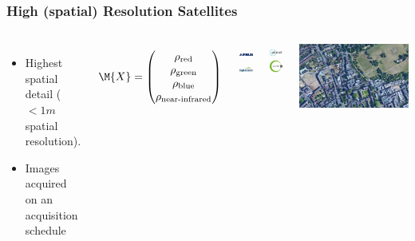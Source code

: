 \begin{frame}
\frametitle{High (spatial) Resolution Satellites}
\begin{columns}
	
	\begin{itemize}
		\item Highest spatial detail ($<1m$ spatial resolution).
		\item Images acquired on an acquisition schedule
	\end{itemize}
	
	\begin{equation*}
		\M{X} = \begin{pmatrix}
		\rho_\text{red} \\ 
		\rho_\text{green} \\
		\rho_\text{blue} \\
		\rho_\text{near-infrared}
		\end{pmatrix}
	\end{equation*}
	
	\vspace{1em}
	
	\includegraphics[width=1.5cm]{images/airbus}
	\hspace{1em}
	\includegraphics[width=1.5cm]{images/digitalglobe}
	
	\vspace{1em}
	\includegraphics[width=2cm]{images/planet}
	\includegraphics[width=1cm]{images/earthi}
	
	
	
	\includegraphics[width=\textwidth]{images/wolfson_vhr.png}
	
\end{columns}
\end{frame}

